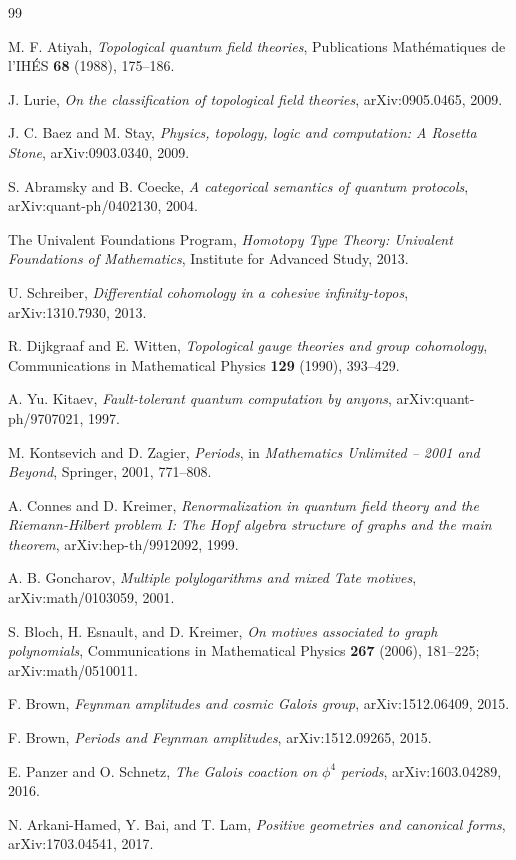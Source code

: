 \documentclass[11pt]{article}
\begin{document}
\begin{thebibliography}{99}

M. F. Atiyah,
\emph{Topological quantum field theories},
Publications Math\'ematiques de l'IH\'ES \textbf{68} (1988), 175--186.

J. Lurie,
\emph{On the classification of topological field theories},
arXiv:0905.0465, 2009.

J. C. Baez and M. Stay,
\emph{Physics, topology, logic and computation: A Rosetta Stone},
arXiv:0903.0340, 2009.

S. Abramsky and B. Coecke,
\emph{A categorical semantics of quantum protocols},
arXiv:quant-ph/0402130, 2004.

The Univalent Foundations Program,
\emph{Homotopy Type Theory: Univalent Foundations of Mathematics},
Institute for Advanced Study, 2013.

U. Schreiber,
\emph{Differential cohomology in a cohesive infinity-topos},
arXiv:1310.7930, 2013.

R. Dijkgraaf and E. Witten,
\emph{Topological gauge theories and group cohomology},
Communications in Mathematical Physics \textbf{129} (1990), 393--429.

A. Yu. Kitaev,
\emph{Fault-tolerant quantum computation by anyons},
arXiv:quant-ph/9707021, 1997.

M. Kontsevich and D. Zagier,
\emph{Periods},
in \emph{Mathematics Unlimited -- 2001 and Beyond}, Springer, 2001, 771--808.

A. Connes and D. Kreimer,
\emph{Renormalization in quantum field theory and the Riemann-Hilbert problem I: The Hopf algebra structure of graphs and the main theorem},
arXiv:hep-th/9912092, 1999.

A. B. Goncharov,
\emph{Multiple polylogarithms and mixed Tate motives},
arXiv:math/0103059, 2001.

S. Bloch, H. Esnault, and D. Kreimer,
\emph{On motives associated to graph polynomials},
Communications in Mathematical Physics \textbf{267} (2006), 181--225; arXiv:math/0510011.

F. Brown,
\emph{Feynman amplitudes and cosmic Galois group},
arXiv:1512.06409, 2015.

F. Brown,
\emph{Periods and Feynman amplitudes},
arXiv:1512.09265, 2015.

E. Panzer and O. Schnetz,
\emph{The Galois coaction on $\phi^4$ periods},
arXiv:1603.04289, 2016.

N. Arkani-Hamed, Y. Bai, and T. Lam,
\emph{Positive geometries and canonical forms},
arXiv:1703.04541, 2017.

\end{thebibliography}
\end{document}
